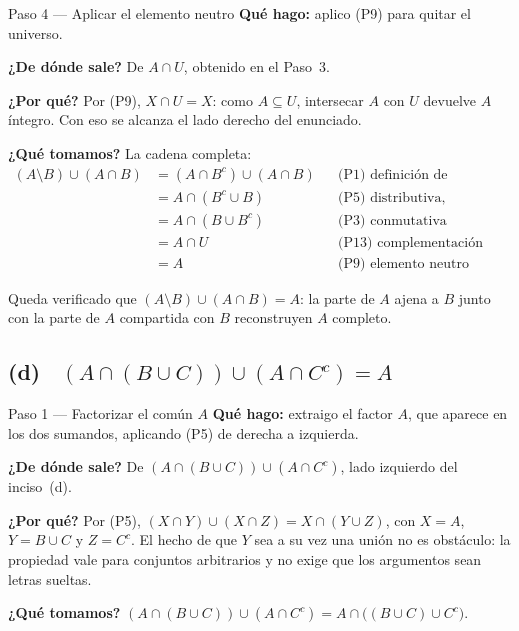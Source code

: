 \documentclass[11pt]{article}
\begin{document}
\begin{paso}{Paso 4 --- Aplicar el elemento neutro}
\textbf{Qué hago:} aplico (P9) para quitar el universo.

\textbf{¿De dónde sale?} De $A\cap U$, obtenido en el Paso~3.

\textbf{¿Por qué?} Por (P9), $X\cap U=X$: como $A\subseteq U$, intersecar $A$ con $U$ devuelve
$A$ íntegro. Con eso se alcanza el lado derecho del enunciado.

\textbf{¿Qué tomamos?} La cadena completa:
\begin{align*}
(A\setminus B)\cup(A\cap B)
&=(A\cap B^{c})\cup(A\cap B) && \text{(P1) definición de diferencia}\\
&=A\cap(B^{c}\cup B) && \text{(P5) distributiva, factorizando}\\
&=A\cap(B\cup B^{c}) && \text{(P3) conmutativa}\\
&=A\cap U && \text{(P13) complementación}\\
&=A && \text{(P9) elemento neutro}
\end{align*}
\end{paso}

\begin{resp}
Queda verificado que $(A\setminus B)\cup(A\cap B)=A$: la parte de $A$ ajena a $B$ junto con la
parte de $A$ compartida con $B$ reconstruyen $A$ completo.
\end{resp}

\subsection*{(d) \ $(A\cap(B\cup C))\cup(A\cap C^{c})=A$}

\begin{paso}{Paso 1 --- Factorizar el común $A$}
\textbf{Qué hago:} extraigo el factor $A$, que aparece en los dos sumandos, aplicando (P5) de
derecha a izquierda.

\textbf{¿De dónde sale?} De $(A\cap(B\cup C))\cup(A\cap C^{c})$, lado izquierdo del inciso~(d).

\textbf{¿Por qué?} Por (P5), $(X\cap Y)\cup(X\cap Z)=X\cap(Y\cup Z)$, con $X=A$, $Y=B\cup C$ y
$Z=C^{c}$. El hecho de que $Y$ sea a su vez una unión no es obstáculo: la propiedad vale para
conjuntos arbitrarios y no exige que los argumentos sean letras sueltas.

\textbf{¿Qué tomamos?} $(A\cap(B\cup C))\cup(A\cap C^{c})=A\cap\bigl((B\cup C)\cup C^{c}\bigr)$.
\end{paso}
\end{document}
